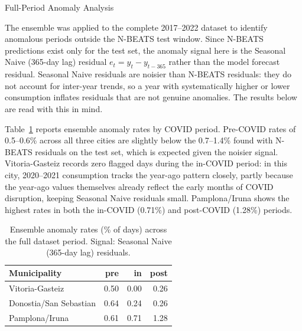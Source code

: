 ﻿\documentclass[12pt,reqno, twoside]{amsbook}
\makeatletter
\numberwithin{figure}{chapter}
\numberwithin{table}{chapter}
\numberwithin{equation}{chapter}
\def\subsection{\@startsection{subsection}{2}%
      \z@{.5\linespacing\@plus.7\linespacing}{.25\linespacing}%
      {\normalfont\bfseries\flushleft}}
\theoremstyle{plain}
\numberwithin{equation}{chapter}
\numberwithin{section}{chapter}
\makeatother
\begin{document}
\FloatBarrier

\subsection{Full-Period Anomaly Analysis}
\label{subsec:anomaly_full}

The ensemble was applied to the complete 2017--2022 dataset to identify anomalous periods outside the N-BEATS test window. Since N-BEATS predictions exist only for the test set, the anomaly signal here is the Seasonal Naive (365-day lag) residual $e_t = y_t - y_{t-365}$ rather than the model forecast residual. Seasonal Naive residuals are noisier than N-BEATS residuals: they do not account for inter-year trends, so a year with systematically higher or lower consumption inflates residuals that are not genuine anomalies. The results below are read with this in mind.

Table~\ref{tab:full_period_anomaly} reports ensemble anomaly rates by COVID period. Pre-COVID rates of 0.5--0.6\% across all three cities are slightly below the 0.7--1.4\% found with N-BEATS residuals on the test set, which is expected given the noisier signal. Vitoria-Gasteiz records zero flagged days during the in-COVID period: in this city, 2020--2021 consumption tracks the year-ago pattern closely, partly because the year-ago values themselves already reflect the early months of COVID disruption, keeping Seasonal Naive residuals small. Pamplona/Iruna shows the highest rates in both the in-COVID (0.71\%) and post-COVID (1.28\%) periods.

\begin{table}[htbp]
\centering
\caption{Ensemble anomaly rates (\% of days) across the full dataset period. Signal: Seasonal Naive (365-day lag) residuals.}
\label{tab:full_period_anomaly}
\begin{tabular}{lrrr}
\toprule
\textbf{Municipality} & \textbf{pre} & \textbf{in} & \textbf{post} \\
\midrule
Vitoria-Gasteiz        & 0.50 & 0.00 & 0.26 \\
Donostia/San Sebastian & 0.64 & 0.24 & 0.26 \\
Pamplona/Iruna         & 0.61 & 0.71 & 1.28 \\
\bottomrule
\end{tabular}
\end{table}
\end{document}
